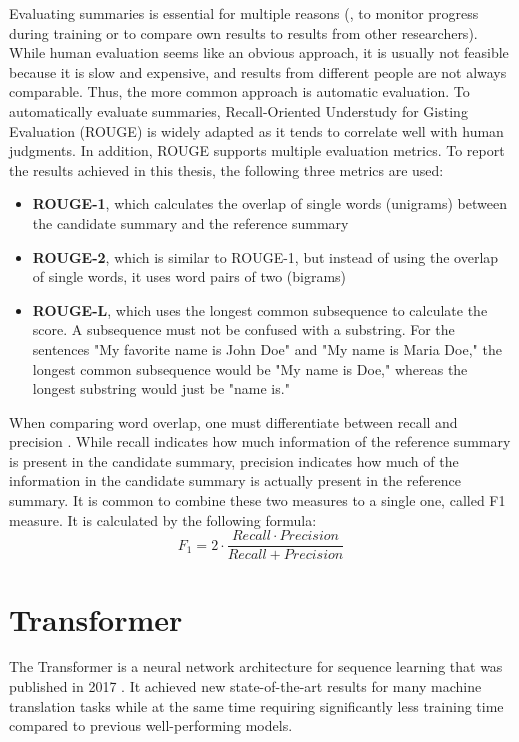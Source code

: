 Evaluating summaries is essential for multiple reasons (\eg, to monitor progress during training or to compare own results to results from other researchers).
While human evaluation seems like an obvious approach, it is usually not feasible because it is slow and expensive, and results from different people are not always comparable.
Thus, the more common approach is automatic evaluation.
To automatically evaluate summaries, Recall-Oriented Understudy for Gisting Evaluation (ROUGE) \cite{lin-2004-rouge} is widely adapted as it tends to correlate well with human judgments.
In addition, ROUGE supports multiple evaluation metrics.
To report the results achieved in this thesis, the following three metrics are used:
\begin{itemize}
\item \textbf{ROUGE-1}, which calculates the overlap of single words (unigrams) between the candidate summary and the reference summary
\item \textbf{ROUGE-2}, which is similar to ROUGE-1, but instead of using the overlap of single words, it uses word pairs of two (bigrams)
\item \textbf{ROUGE-L}, which uses the longest common subsequence to calculate the score. A subsequence must not be confused with a substring. For the sentences "My favorite name is John Doe" and "My name is Maria Doe," the longest common subsequence would be "My name is Doe," whereas the longest substring would just be "name is."
\end{itemize}

When comparing word overlap, one must differentiate between recall and precision \cite{Ting2010}.
While recall indicates how much information of the reference summary is present in the candidate summary, precision indicates how much of the information in the candidate summary is actually present in the reference summary.
It is common to combine these two measures to a single one, called F1 measure.
It is calculated by the following formula:
\[
	F_1 = 2 \cdot \frac{Recall \cdot Precision}{Recall + Precision}
\]


\section{Transformer}\label{sec:transformer}

The Transformer is a neural network architecture for sequence learning that was published in 2017 \cite{1706.03762}.
It achieved new state-of-the-art results for many machine translation tasks while at the same time requiring significantly less training time compared to previous well-performing models.

